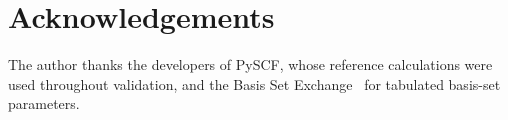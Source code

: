 \documentclass[1p,times]{elsarticle}
\begin{document}
\section*{Acknowledgements}

The author thanks the developers of PySCF, whose reference calculations were
used throughout validation, and the Basis Set Exchange~\cite{pritchard2019}
for tabulated basis-set parameters.



\end{document}
